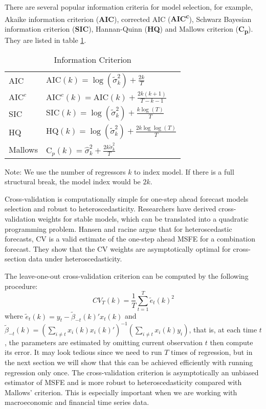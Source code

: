 \documentclass[a4paper,12pt]{article}
\begin{document}
There are several popular information criteria for model selection, for example, Akaike information criterion (\textbf{AIC}), corrected AIC (\textbf{AIC\textsuperscript{c}}), Schwarz Bayesian information criterion (\textbf{SIC}), Hannan-Quinn (\textbf{HQ}) and Mallows criterion (\textbf{C\textsubscript{p}}). They are listed in table \ref{tb:1}.
\begin{table}
\centering
\caption{Information Criterion} \label{tb:1}
\begin{threeparttable}
\begin{tabular}{ll}
\toprule
AIC                 & $\mathrm{AIC}(k) = \log{(\tilde{\sigma}^{2}_{k})} + \frac{2k}{T}$ \\[0.4em]
$\mathrm{AIC}^{c}$  & $\mathrm{AIC}^{c}(k) = \mathrm{AIC}(k) + \frac{2k(k+1)}{T-k-1}$ \\[0.4em]
SIC                 & $\mathrm{SIC}(k) = \log{(\tilde{\sigma}^{2}_{k})} + \frac{k\log{(T)}}{T}$ \\[0.4em]
HQ                  & $\mathrm{HQ}(k) = \log{(\tilde{\sigma}^{2}_{k})} + \frac{2k\log{\log(T)}}{T}$ \\[0.4em]
Mallows            & $\mathrm{C}_{p}(k) = \hat{\sigma}^{2}_{k} + \frac{2k\tilde{\sigma}^{2}_{k}}{T}$\\
\bottomrule
\end{tabular}
\begin{tablenotes} \footnotesize
Note: We use the number of regressors $k$ to index model. If there is a full structural break, the model index would be $2k$.
\end{tablenotes}
\end{threeparttable}
\end{table}

Cross-validation is computationally simple for one-step ahead forecast models selection and robust to heteroscedasticity. Researchers have derived cross-validation weights for stable models, which can be translated into a quadratic programming problem. Hansen and racine \cite{hansen2011jackknife} argue that for heteroscedastic forecasts, CV is a valid estimate of the one-step ahead MSFE for a combination forecast. They show that the CV weights are asymptotically optimal for cross-section data under heteroscedasticity.

The leave-one-out cross-validation criterion can be computed by the following procedure:
\begin{equation}
	CV_T(k) = \frac{1}{T}\sum_{t=1}^{T}\tilde{e}_{t}(k)^{2}
\end{equation}
where $\tilde{e}_{t}(k) = y_t - \tilde{\beta}_{-t}(k)'x_t(k)$ and $\tilde{\beta}_{-t}(k) = (\sum_{i\not= t}x_i(k) x_i(k)')^{-1}(\sum_{i\not= t}x_i(k) y_i)$, that is, at each time $t$, the parameters are estimated by omitting current observation $t$ then compute its error. It may look tedious since we need to run $T$ times of regression, but in the next section we will show that this can be achieved efficiently with running regression only once. The cross-validation criterion is asymptotically an unbiased estimator of MSFE and is more robust to heteroscedasticity compared with Mallows' criterion. This is especially important when we are working with macroeconomic and financial time series data.
\end{document}
